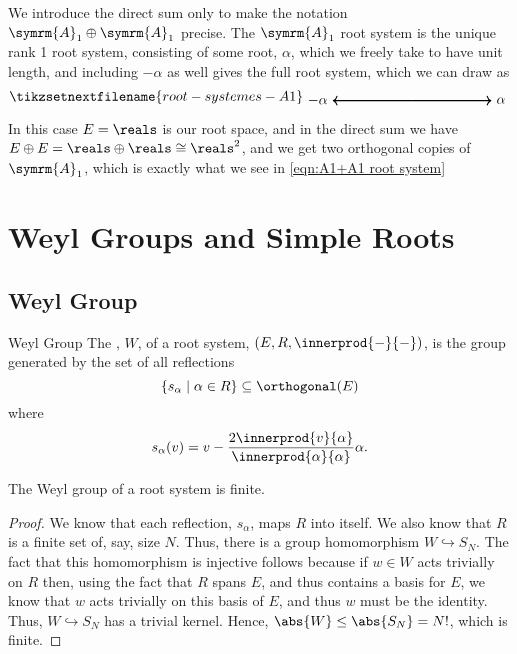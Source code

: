 \documentclass[fleqn]{NotesClass}
\newcommand{\isomorphic}{\cong}
\newcommand{\dynkin}[2]{\symrm{#1}_{#2}}
\begin{document}
    We introduce the direct sum only to make the notation \(\dynkin{A}{1} \oplus \dynkin{A}{1}\) precise.
    The \(\dynkin{A}{1}\) root system is the unique rank 1 root system, consisting of some root, \(\alpha\), which we freely take to have unit length, and including \(-\alpha\) as well gives the full root system, which we can draw as
    \begin{equation}
        \tikzsetnextfilename{root-systemes-A1}
        \begin{tikzpicture}[baseline=(current bounding box)]
            \draw[->, thick] (0, 0) -- (2, 0) node [right] {\(\alpha\)};
            \draw[->, thick] (0, 0) -- (-2, 0) node [left] {\(-\alpha\)}; 
        \end{tikzpicture}
    \end{equation}
    In this case \(E = \reals\) is our root space, and in the direct sum we have \(E \oplus E = \reals \oplus \reals \isomorphic \reals^2\), and we get two orthogonal copies of \(\dynkin{A}{1}\), which is exactly what we see in \cref{eqn:A1+A1 root system}
    
    \chapter{Weyl Groups and Simple Roots}
    \section{Weyl Group}
    \begin{dfn}{Weyl Group}{}
        The , \(W\), of a root system, \((E, R, \innerprod{-}{-})\), is the group generated by the set of all reflections
        \begin{equation}
            \{s_\alpha \mid \alpha \in R\} \subseteq \orthogonal(E)
        \end{equation}
        where
        \begin{equation}
            s_\alpha(v) = v - \frac{2\innerprod{v}{\alpha}}{\innerprod{\alpha}{\alpha}} \alpha.
        \end{equation}
    \end{dfn}
    
    \begin{lma}{}{}
        The Weyl group of a root system is finite.
        \begin{proof}
            We know that each reflection, \(s_\alpha\), maps \(R\) into itself.
            We also know that \(R\) is a finite set of, say, size \(N\).
            Thus, there is a group homomorphism \(W \hookrightarrow S_N\).
            The fact that this homomorphism is injective follows because if \(w \in W\) acts trivially on \(R\) then, using the fact that \(R\) spans \(E\), and thus contains a basis for \(E\), we know that \(w\) acts trivially on this basis of \(E\), and thus \(w\) must be the identity.
            Thus, \(W \hookrightarrow S_N\) has a trivial kernel.
            Hence, \(\abs{W} \le \abs{S_N} = N!\), which is finite.
        \end{proof}
    \end{lma}
    
\end{document}
